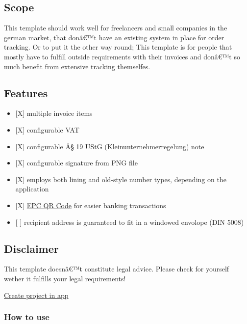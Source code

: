 
\subsection{Scope}\label{scope}

This template should work well for freelancers and small companies in
the german market, that donâ€™t have an existing system in place for
order tracking. Or to put it the other way round; This template is for
people that mostly have to fulfill outside requirements with their
invoices and donâ€™t so much benefit from extensive tracking themselfes.

\subsection{Features}\label{features}

\begin{itemize}
\tightlist
\item
  {[}X{]} multiple invoice items
\item
  {[}X{]} configurable VAT
\item
  {[}X{]} configurable Â§ 19 UStG (Kleinunternehmerregelung) note
\item
  {[}X{]} configurable signature from PNG file
\item
  {[}X{]} employs both lining and old-style number types, depending on
  the application
\item
  {[}X{]} \href{https://en.wikipedia.org/wiki/EPC_QR_code}{EPC QR Code}
  for easier banking transactions
\item
  {[} {]} recipient address is guaranteed to fit in a windowed envolope
  (DIN 5008)
\end{itemize}

\subsection{Disclaimer}\label{disclaimer}

This template doesnâ€™t constitute legal advice. Please check for
yourself wether it fulfills your legal requirements!

\href{/app?template=classy-german-invoice&version=0.3.0}{Create project
in app}

\subsubsection{How to use}\label{how-to-use}

